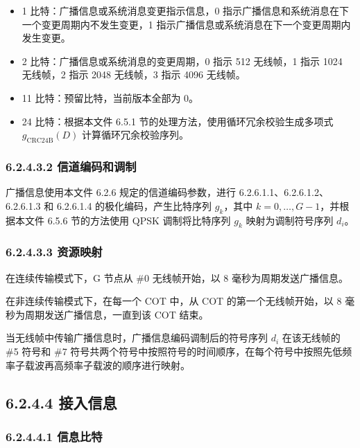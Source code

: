 \documentclass[11pt,a4paper]{ctexart}
\begin{document}
\begin{itemize}[nosep]
  \item 1 比特：广播信息或系统消息变更指示信息，0 指示广播信息和系统消息在下一个变更周期内不发生变更，1 指示广播信息或系统消息在下一个变更周期内发生变更。
  \item 2 比特：广播信息或系统消息的变更周期，0 指示 512 无线帧，1 指示 1024 无线帧，2 指示 2048 无线帧，3 指示 4096 无线帧。
  \item 11 比特：预留比特，当前版本全部为 0。
  \item 24 比特：根据本文件 6.5.1 节的处理方法，使用循环冗余校验生成多项式 $g_{\mathrm{CRC24B}}(D)$ 计算循环冗余校验序列。
\end{itemize}

\subsubsection{6.2.4.3.2 信道编码和调制}

广播信息使用本文件 6.2.6 规定的信道编码参数，进行 6.2.6.1.1、6.2.6.1.2、6.2.6.1.3 和 6.2.6.1.4 的极化编码，产生比特序列 $g_k$，其中 $k = 0, \ldots, G-1$，并根据本文件 6.5.6 节的方法使用 QPSK 调制将比特序列 $g_k$ 映射为调制符号序列 $d_i$。

\subsubsection{6.2.4.3.3 资源映射}

在连续传输模式下，G 节点从 \#0 无线帧开始，以 8 毫秒为周期发送广播信息。

在非连续传输模式下，在每一个 COT 中，从 COT 的第一个无线帧开始，以 8 毫秒为周期发送广播信息，一直到该 COT 结束。

当无线帧中传输广播信息时，广播信息编码调制后的符号序列 $d_i$ 在该无线帧的 \#5 符号和 \#7 符号共两个符号中按照符号的时间顺序，在每个符号中按照先低频率子载波再高频率子载波的顺序进行映射。

\subsection{6.2.4.4 接入信息}

\subsubsection{6.2.4.4.1 信息比特}
\end{document}
